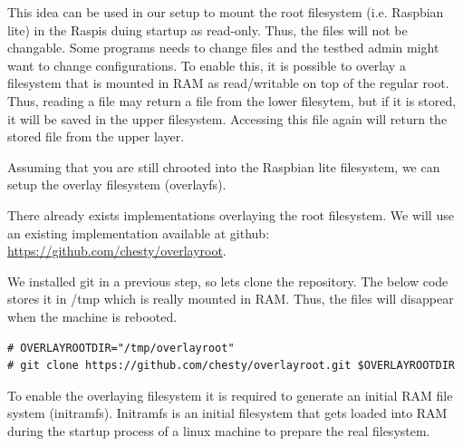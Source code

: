 This idea can be used in our setup to mount the root filesystem (i.e. Raspbian
lite) in the \ac{Raspi}s duing startup as read-only. Thus, the files will not
be changable. Some programs needs to change files and the testbed admin might
want to change configurations. To enable this, it is possible to
overlay a filesystem that is mounted in \ac{RAM} as read/writable on top of
the regular root. Thus, reading a file may return a file from the lower filesytem,
but if it is stored, it will be saved in the upper filesystem. Accessing this file
again will return the stored file from the upper layer.



%
%
%
%

Assuming that you are still chrooted into the Raspbian lite filesystem, we
can setup the overlay filesystem (overlayfs).

There already exists implementations overlaying the root filesystem. We will
use an existing implementation
available at github: \url{https://github.com/chesty/overlayroot}.

We installed git in a previous step, so lets clone the repository. The below
code stores it in /tmp which is really mounted in \ac{RAM}. Thus, the files
will disappear when the machine is rebooted.

\begin{lstlisting}[]
# OVERLAYROOTDIR="/tmp/overlayroot"
# git clone https://github.com/chesty/overlayroot.git $OVERLAYROOTDIR
\end{lstlisting}
\FloatBarrier
\vspace{-5mm}

To enable the overlaying filesystem it is required to generate an initial \ac{RAM}
file system (initramfs). Initramfs is an initial filesystem that gets loaded into
\ac{RAM} during the startup process of a linux machine to prepare the real
filesystem.


